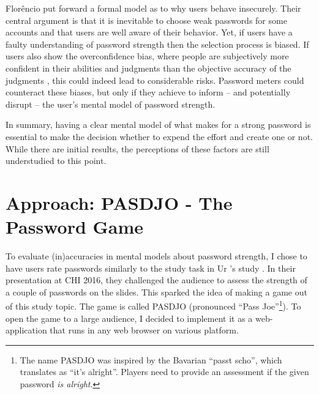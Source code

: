 Florêncio \etal put forward a formal model as to why users behave insecurely. Their central argument is that it is inevitable to choose weak passwords for some accounts and that users are well aware of their behavior. Yet, if users have a faulty understanding of password strength then the selection process is biased. If users also show the overconfidence bias, where people are subjectively more confident in their abilities and judgments than the objective accuracy of the judgments \cite{Simonson1989ChoiceBasedOnReasons}, this could indeed lead to considerable risks. Password meters could counteract these biases, but only if they achieve to inform -- and potentially disrupt -- the user's mental model of password strength. 

In summary, having a clear mental model of what makes for a strong password is essential to make the decision whether to expend the effort and create one or not. While there are initial results, the perceptions of these factors are still understudied to this point.






\section{Approach: PASDJO - The Password Game}
To evaluate (in)accuracies in mental models about password strength, I chose to have users rate passwords similarly to the study task in Ur \etal's study \cite{Ur2016PerceptionsPassword}. In their presentation at CHI 2016, they challenged the audience to assess the strength of a couple of passwords on the slides. This sparked the idea of making a game out of this study topic. The game is called PASDJO (pronounced ``Pass  Joe''\footnote{The name PASDJO was inspired by the Bavarian ``passt scho'', which translates as ``it's alright''. Players need to provide an assessment if the given password \textit{is alright}.}). To open the game to a large audience, I decided to implement it as a web-application that runs in any web browser on various platform. 

